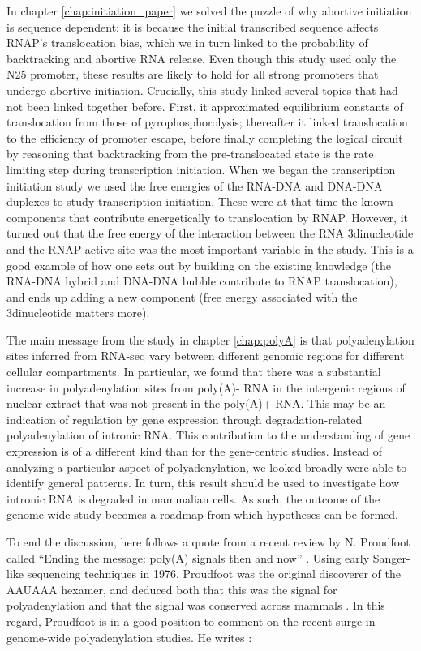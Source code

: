 In chapter \ref{chap:initiation_paper} we solved the puzzle of why abortive
initiation is sequence dependent: it is because the initial transcribed
sequence affects RNAP's translocation bias, which we in turn linked to the
probability of backtracking and abortive RNA release. Even though this study
used only the N25 promoter, these results are likely to hold for all strong
promoters that undergo abortive initiation. Crucially, this study linked
several topics that had not been linked together before. First, it approximated
equilibrium constants of translocation from those of pyrophosphorolysis;
thereafter it linked translocation to the efficiency of promoter escape, before
finally completing the logical circuit by reasoning that backtracking from the
pre-translocated state is the rate limiting step during transcription
initiation. When we began the transcription initiation study we used the free
energies of the RNA-DNA and DNA-DNA duplexes to study transcription initiation.
These were at that time the known components that contribute energetically to
translocation by RNAP. However, it turned out that the free energy of the
interaction between the RNA 3\ppp dinucleotide and the RNAP active site was the
most important variable in the study. This is a good example of how one sets
out by building on the existing knowledge (the RNA-DNA hybrid and DNA-DNA
bubble contribute to RNAP translocation), and ends up adding a new component
(free energy associated with the 3\ppp dinucleotide matters more).

The main message from the study in chapter \ref{chap:polyA} is that
polyadenylation sites inferred from RNA-seq vary between different genomic
regions for different cellular compartments. In particular, we found that there
was a substantial increase in polyadenylation sites from poly(A)- RNA in the
intergenic regions of nuclear extract that was not present in the poly(A)+ RNA.
This may be an indication of regulation by gene expression through
degradation-related polyadenylation of intronic RNA. This contribution to the
understanding of gene expression is of a different kind than for the
gene-centric studies. Instead of analyzing a particular aspect of
polyadenylation, we looked broadly were able to identify general patterns. In
turn, this result should be used to investigate how intronic RNA is degraded in
mammalian cells. As such, the outcome of the genome-wide study becomes a
roadmap from which hypotheses can be formed.

To end the discussion, here follows a quote from a recent review by N.
Proudfoot called ``Ending the message: poly(A) signals then and now''
\cite{proudfoot_ending_2011}. Using early Sanger-like sequencing techniques in
1976, Proudfoot was the original discoverer of the AAUAAA hexamer, and deduced
both that this was the signal for polyadenylation and that the signal was
conserved across mammals \cite{proudfoot_3_1976}. In this regard, Proudfoot is
in a good position to comment on the recent surge in genome-wide
polyadenylation studies. He writes \cite{proudfoot_ending_2011}:

